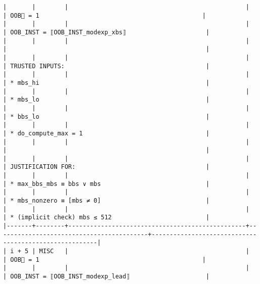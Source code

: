 \documentclass[varwidth=\maxdimen,margin=0.5cm,multi={verbatim}]{standalone}
\begin{document}
\begin{verbatim}
|       |        |                                                 |                                          | OOB🏴 = 1                                             |
|       |        |                                                 |                                          | OOB_INST = ⟦OOB_INST_modexp_xbs⟧                      |
|       |        |                                                 |                                          |                                                       |
|       |        |                                                 |                                          | TRUSTED INPUTS:                                       |
|       |        |                                                 |                                          | * mbs_hi                                              |
|       |        |                                                 |                                          | * mbs_lo                                              |
|       |        |                                                 |                                          | * bbs_lo                                              |
|       |        |                                                 |                                          | * do_compute_max = 1                                  |
|       |        |                                                 |                                          |                                                       |
|       |        |                                                 |                                          | JUSTIFICATION FOR:                                    |
|       |        |                                                 |                                          | * max_bbs_mbs ≡ bbs ∨ mbs                             |
|       |        |                                                 |                                          | * mbs_nonzero ≡ [mbs ≠ 0]                             |
|       |        |                                                 |                                          | * (implicit check) mbs ≤ 512                          |
|-------+--------+-------------------------------------------------+------------------------------------------+-------------------------------------------------------|
| i + 5 | MISC   |                                                 |                                          | OOB🏴 = 1                                             |
|       |        |                                                 |                                          | OOB_INST = ⟦OOB_INST_modexp_lead⟧                     |

\end{verbatim}
\end{document}
